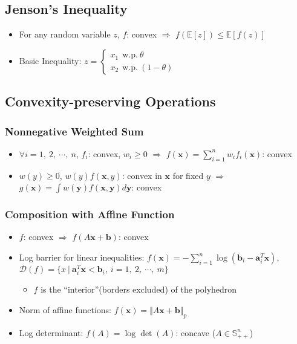 \subsection{Jenson's Inequality}
\begin{itemize}
    \item For any random variable $z$, $f$: convex $\Rightarrow$ $f(\mathbb{E}[z]) \leq \mathbb{E}[f(z)]$
    \item Basic Inequality: $z = \begin{cases} x_1~~\mathrm{w.p.}~\theta \\ x_2~~\mathrm{w.p.}~(1-\theta) \end{cases}$
\end{itemize}

\subsection{Convexity-preserving Operations}

\subsubsection*{Nonnegative Weighted Sum}
\begin{itemize}
    \item $\forall i=1,~2,~\cdots,~n$, $f_i$: convex, $w_i \geq 0$ $\Rightarrow$
        $f(\mathbf{x}) = \sum_{i=1}^n w_i f_i (\mathbf{x})$: convex
    \item $w(y) \geq 0$, $w(y) f(\mathbf{x},y)$: convex in $\mathbf{x}$ for fixed $y$ $\Rightarrow$
        $g(\mathbf{x}) = \int w(\mathbf{y}) f(\mathbf{x}, \mathbf{y}) d\mathbf{y}$: convex
\end{itemize}

\subsubsection*{Composition with Affine Function}
\begin{itemize}
    \item $f$: convex $\Rightarrow$ $f(A\mathbf{x} + \mathbf{b})$: convex
    \item Log barrier for linear inequalities: 
        $f(\mathbf{x}) = - \sum_{i=1}^n \log (\mathbf{b}_i - \mathbf{a}_i^T \mathbf{x})$,
        $\mathcal{D}(f) = \{x~|~\mathbf{a}_i^T \mathbf{x} < \mathbf{b}_i,~i=1,~2,~\cdots,~m\}$
    \begin{itemize}
        \item $f$ is the ``interior''(borders excluded) of the polyhedron
    \end{itemize}
    \item Norm of affine functions: $f(\mathbf{x}) = \Vert A\mathbf{x} + \mathbf{b} \Vert_p$
    \item Log determinant: $f(A) = \log \det (A)$: concave ($A \in \mathbb{S}^n_{++}$)
\end{itemize}

